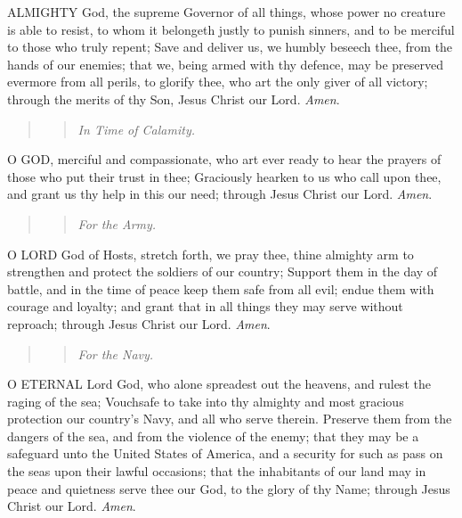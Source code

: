 ALMIGHTY
God, the supreme Governor of all things, whose power no creature is able
to resist, to whom it belongeth justly to punish sinners, and to be merciful
to those who truly repent; Save and deliver us, we humbly beseech thee,
from the hands of our enemies; that we, being armed with thy defence,
may be preserved evermore from all perils, to glorify thee, who art the
only giver of all victory; through the merits of thy Son, Jesus Christ
our Lord. \emph{Amen}.

\begin{quote}

\begin{quote}

\emph{In
Time of Calamity.}

\end{quote}

\end{quote}

O
GOD, merciful and compassionate, who art ever ready to hear the prayers
of those who put their trust in thee; Graciously hearken to us who call
upon thee, and grant us thy help in this our need; through Jesus Christ
our Lord. \emph{Amen}.

\begin{quote}

\begin{quote}

\emph{For
the Army.}

\end{quote}

\end{quote}

O
LORD God of Hosts, stretch forth, we pray thee, thine almighty arm to
strengthen and protect the soldiers of our country; Support them in the
day of battle, and in the time of peace keep them safe from all evil;
endue them with courage and loyalty; and grant that in all things they
may serve without reproach; through Jesus Christ our Lord. \emph{Amen}.

\begin{quote}

\begin{quote}

\emph{For
the Navy.}

\end{quote}

\end{quote}

O
ETERNAL Lord God, who alone spreadest out the heavens, and rulest the
raging of the sea; Vouchsafe to take into thy almighty and most gracious
protection our country’s Navy, and all who serve therein. Preserve
them from the dangers of the sea, and from the violence of the enemy;
that they may be a safeguard unto the United States of America, and a
security for such as pass on the seas upon their lawful occasions; that
the inhabitants of our land may in peace and quietness serve thee our
God, to the glory of thy Name; through Jesus Christ our Lord. \emph{Amen}.

